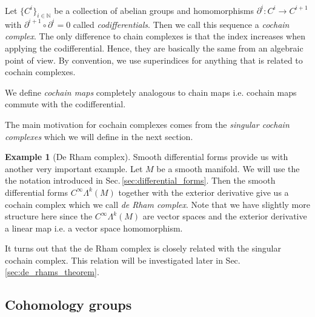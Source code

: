 \documentclass[12pt,a4paper]{article}
\numberwithin{equation}{subsection}
\numberwithin{lemma}{subsection}
\theoremstyle{definition}
\newtheorem{example}[lemma]{Example}
\newcommand{\naturalnum}{\mathbb{N}}
\begin{document}
Let $\{ C^i \}_{i\in \naturalnum}$ be a collection of abelian groups
and homomorphisms $\partial^i: C^i \rightarrow C^{i+1}$ with 
$\partial^{i+1} \circ \partial^i = 0$ called \textit{codifferentials}. 
Then we call this sequence a 
\textit{cochain complex}. The only difference to chain complexes
is that the index 
increases when applying the codifferential. Hence, they are 
basically the same from an algebraic point of view.
By convention, 
we use superindices for anything that is related to cochain complexes.

We define \textit{cochain maps} completely analogous to chain maps 
i.e. cochain maps commute with the codifferential.

The main motivation for cochain complexes comes from the 
\textit{singular cochain complexes} which we will define in the next 
section.

\begin{example}[De Rham complex]
    Smooth differential forms provide us with another very important example. 
    Let $M$ be a smooth manifold.
    We will use the the notation introduced in 
    Sec.\,\ref{sec:differential_forms}. Then the smooth 
    differential forms $C^\infty \Lambda^k (M)$ together 
    with the exterior derivative give us a cochain complex which we call 
    \textit{de Rham complex}. Note that we have slightly more structure here
    since the $C^\infty \Lambda^k (M)$ are vector spaces and the exterior
    derivative a linear map i.e. a vector space homomorphism.
\end{example}
It turns out that the de Rham complex is closely related with the 
singular cochain complex. This relation will be investigated later in 
Sec.\,\ref{sec:de_rhams_theorem}. %

\subsection{Cohomology groups}
\end{document}
